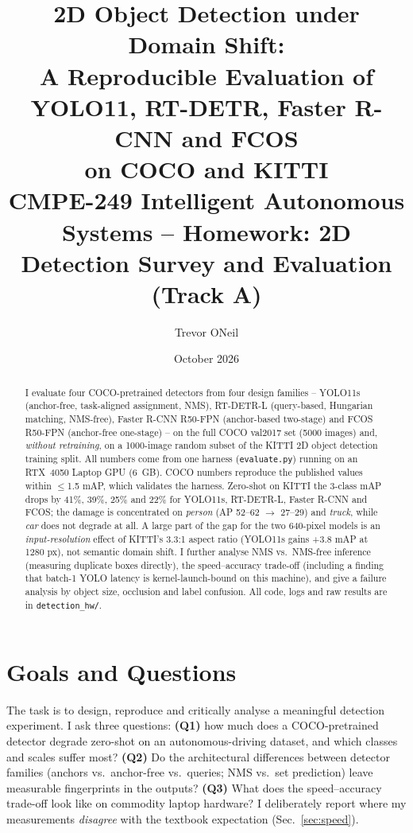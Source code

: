\documentclass[10pt]{article}
\title{\vspace{-1.2cm}\textbf{2D Object Detection under Domain Shift:\\ A Reproducible Evaluation of YOLO11, RT-DETR, Faster R-CNN and FCOS\\ on COCO and KITTI}\\[2pt]
\large CMPE-249 Intelligent Autonomous Systems -- Homework: 2D Detection Survey and Evaluation (Track A)}
\author{Trevor ONeil}
\date{October 2026}
\newcommand{\code}[1]{\texttt{\small #1}}
\begin{document}
\maketitle
\vspace{-0.8cm}
\begin{abstract}\small
I evaluate four COCO-pretrained detectors from four design families -- YOLO11s (anchor-free, task-aligned assignment, NMS), RT-DETR-L (query-based, Hungarian matching, NMS-free), Faster R-CNN R50-FPN (anchor-based two-stage) and FCOS R50-FPN (anchor-free one-stage) -- on the full COCO val2017 set (5000 images) and, \emph{without retraining}, on a 1000-image random subset of the KITTI 2D object detection training split. All numbers come from one harness (\code{evaluate.py}) running on an RTX~4050 Laptop GPU (6~GB). COCO numbers reproduce the published values within $\le$1.5 mAP, which validates the harness. Zero-shot on KITTI the 3-class mAP drops by 41\%, 39\%, 25\% and 22\% for YOLO11s, RT-DETR-L, Faster R-CNN and FCOS; the damage is concentrated on \emph{person} (AP 52--62 $\rightarrow$ 27--29) and \emph{truck}, while \emph{car} does not degrade at all. A large part of the gap for the two 640-pixel models is an \emph{input-resolution} effect of KITTI's 3.3:1 aspect ratio (YOLO11s gains +3.8 mAP at 1280 px), not semantic domain shift. I further analyse NMS vs.\ NMS-free inference (measuring duplicate boxes directly), the speed--accuracy trade-off (including a finding that batch-1 YOLO latency is kernel-launch-bound on this machine), and give a failure analysis by object size, occlusion and label confusion. All code, logs and raw results are in \code{detection\_hw/}.
\end{abstract}

\section{Goals and Questions}
The task is to design, reproduce and critically analyse a meaningful detection experiment. I ask three questions: \textbf{(Q1)} how much does a COCO-pretrained detector degrade zero-shot on an autonomous-driving dataset, and which classes and scales suffer most? \textbf{(Q2)} Do the architectural differences between detector families (anchors vs.\ anchor-free vs.\ queries; NMS vs.\ set prediction) leave measurable fingerprints in the outputs? \textbf{(Q3)} What does the speed--accuracy trade-off look like on commodity laptop hardware? I deliberately report where my measurements \emph{disagree} with the textbook expectation (Sec.~\ref{sec:speed}).
\end{document}
